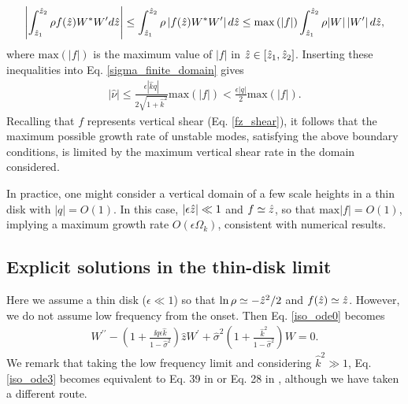 \begin{align}
  \left|\int_{\hat{z}_1}^{\hat{z}_2}\rho
    f(\hat{z}) W^*W^\prime d\hat{z}\right|\leq \int_{\hat{z}_1}^{\hat{z}_2}\rho
  \left|f(\hat{z})W^*W^\prime \right|d\hat{z}
  \leq
  \mathrm{max}\left(|f|\right)\int_{\hat{z}_1}^{\hat{z}_2}\rho
  |W|\left|W^\prime \right|d\hat{z},
\end{align}
where $\mathrm{max}(|f|)$ is the maximum value of $|f|$ in
$\hat{z}\in[\hat{z}_1,\hat{z}_2]$. Inserting these inequalities into
Eq. \ref{sigma_finite_domain} gives
\begin{align}\label{max_growth}
  |\hat{\nu}|\leq
  \frac{\epsilon |\hat{k} q|}{2\sqrt{1+\hat{k}^2}}\mathrm{max}(|f|) < \frac{\epsilon |q|}{2}\mathrm{max}(|f|) . 
\end{align}
Recalling that $f$ represents vertical shear (Eq. \ref{fz_shear}), it
follows that the maximum possible growth rate of unstable modes,
satisfying the above boundary conditions, is limited by the maximum
vertical shear rate in the domain considered.  

In practice, one might consider a vertical domain of a few scale 
heights in a thin disk with $|q|=O(1)$. In this case, $|\epsilon\hat{z}|\ll1$ and  
$f\simeq \hat{z}$, so that $\mathrm{max}|f| = O(1)$, implying a
maximum growth rate $O(\epsilon \Omega_k)$, consistent with numerical
results. 


\subsection{Explicit solutions in the thin-disk limit}\label{iso_explicit}
Here we assume a thin disk ($\epsilon\ll1$) so that $\ln\rho\simeq
-\hat{z}^2/2$ and $f(\hat{z})\simeq \hat{z}$. However, we do not assume 
low frequency from the onset. Then Eq. \ref{iso_ode0} becomes 
\begin{align}\label{iso_ode3}
  W^{\prime\prime} - \left(1 + \frac{\ii q\epsilon \hat{k}}{1-\hat{\sigma}^2}\right)\hat{z}W^\prime  +
  \hat{\sigma}^2\left(1+\frac{\hat{k}^2}{1-\hat{\sigma}^2}\right)W = 0.
\end{align}
We remark that taking the low frequency limit and considering
$\hat{k}^2\gg 1$, Eq. \ref{iso_ode3} becomes equivalent to Eq. 39 in
\cite{nelson13} or Eq. 28 in \cite{barker15}, although we have taken a
different route.    
 

